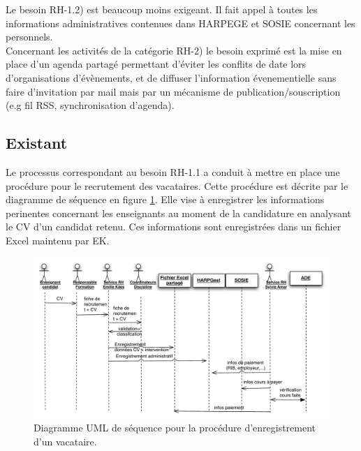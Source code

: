 \documentclass{book}
\begin{document}
Le besoin RH-1.2) est beaucoup moins exigeant. Il fait appel à toutes
les informations administratives contenues dans HARPEGE et SOSIE
concernant les personnels.\\


Concernant les activités de la catégorie RH-2) le besoin exprimé 
est la mise en place d'un agenda partagé permettant d'éviter
les conflits de date lors d'organisations d'évènements, et de 
diffuser l'information évenementielle sans faire d'invitation
par mail mais par un mécanisme de publication/souscription
(e.g fil RSS, synchronisation d'agenda).  



\subsection{Existant}

Le processus correspondant au besoin RH-1.1 a conduit à mettre en
place une procédure pour le recrutement des vacataires. Cette procédure
est décrite par le diagramme de séquence en figure \ref{fg:rh_seq_vacataires}.
Elle vise à enregistrer les informations perinentes concernant les enseignants
au moment de la candidature en analysant le CV d'un candidat retenu. Ces
informations sont enregistrées dans un fichier Excel maintenu par EK.

\begin{figure}[hbt]
\begin{center}
\includegraphics[width=\linewidth]{figs/rh_seq_vacataires.pdf}
\end{center}
\caption{Diagramme UML de séquence pour la procédure d'enregistrement d'un vacataire.}
\label{fg:rh_seq_vacataires}
\end{figure}
\end{document}
